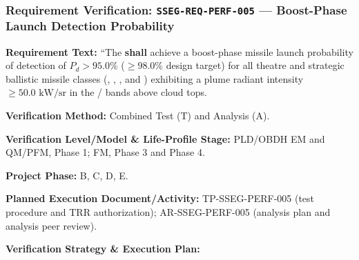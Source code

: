 \subsubsection{Requirement Verification: \texttt{SSEG-REQ-PERF-005} --- Boost-Phase Launch Detection Probability}
\label{ver:SSEG-REQ-PERF-005}
\textbf{Requirement Text:} ``The  \textbf{shall} achieve a boost-phase missile launch probability of detection of $P_d > 95.0\%$ ($\ge 98.0\%$ design target) for all theatre and strategic ballistic missile classes (, , , and ) exhibiting a plume radiant intensity $\ge 50.0\text{ kW/sr}$ in the / bands above cloud tops.
\par\textbf{Verification Method:} Combined Test (T) and Analysis (A).
\par\textbf{Verification Level/Model \& Life-Profile Stage:} PLD/OBDH EM and QM/PFM, Phase 1; FM, Phase 3 and Phase 4.
\par\textbf{Project Phase:} B, C, D, E.
\par\textbf{Planned Execution Document/Activity:} TP-SSEG-PERF-005 (test procedure and TRR authorization); AR-SSEG-PERF-005 (analysis plan and analysis peer review).
\par\textbf{Verification Strategy \& Execution Plan:}
